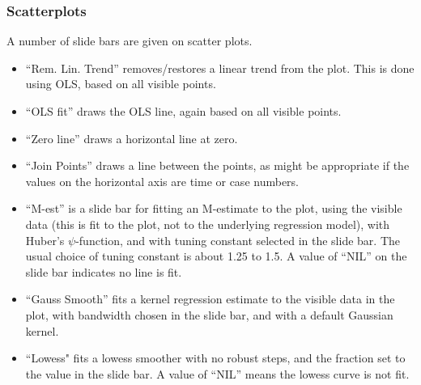 \subsubsection{Scatterplots}
A number of slide bars are given on scatter plots.  
\begin{itemize}
\item ``Rem. Lin. Trend'' removes/restores a linear trend from the plot.
This is done using OLS, based
on all visible points.  
\item ``OLS fit'' draws the OLS line, again based on all
visible points.  
\item ``Zero line'' draws a horizontal line at zero.
\item ``Join Points'' draws a line between the points, as might be 
appropriate if the values on the horizontal axis are time or case numbers.
\item ``M-est'' is a slide bar for fitting an M-estimate
to the plot, using the visible data (this is fit to the plot, not to the
underlying regression model), with Huber's $\psi$-function, and with tuning
constant selected in the slide bar.  The usual choice of tuning constant 
is about 1.25 to 1.5.  A
value of ``NIL'' on the slide bar indicates no line is fit.  
\item ``Gauss Smooth'' fits a kernel regression estimate to the visible 
data in the plot, with
bandwidth chosen in the slide bar, and with a default Gaussian kernel.  
\item ``Lowess" fits a lowess smoother with no robust steps, and the fraction
set to the value in the slide bar.  A value of ``NIL'' means the lowess curve
is not fit.
\end{itemize}
